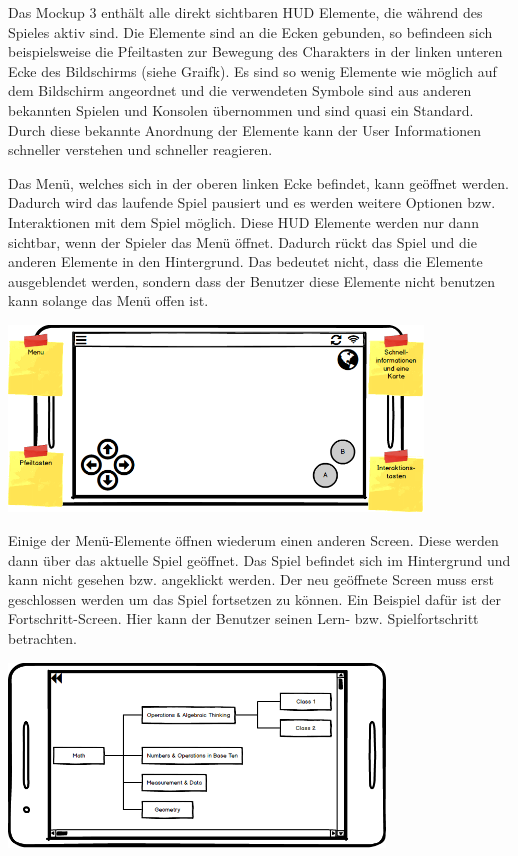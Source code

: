 			Das Mockup 3 enthält alle direkt sichtbaren HUD Elemente, die während des Spieles aktiv sind. Die Elemente sind an die Ecken gebunden, so befindeen sich beispielsweise die Pfeiltasten zur Bewegung des Charakters in der linken unteren Ecke des Bildschirms (siehe Graifk). Es sind so wenig Elemente wie möglich auf dem Bildschirm angeordnet und die verwendeten Symbole sind aus anderen bekannten Spielen und Konsolen übernommen und sind quasi ein Standard. Durch diese bekannte Anordnung der Elemente kann der User Informationen schneller verstehen und schneller reagieren. %
			
			Das Menü, welches sich in der oberen linken Ecke befindet, kann geöffnet werden. Dadurch wird das laufende Spiel pausiert und es werden weitere Optionen bzw. Interaktionen mit dem Spiel möglich. Diese HUD Elemente werden nur dann sichtbar, wenn der Spieler das Menü öffnet. Dadurch rückt das Spiel und die anderen Elemente in den Hintergrund. Das bedeutet nicht, dass die Elemente ausgeblendet werden, sondern dass der Benutzer diese Elemente nicht benutzen kann solange das Menü offen ist.
			
			\begin{center}
				\includegraphics[width=11cm]{pics/HUD_Mockup.png}
			\end{center}
			
			Einige der Menü-Elemente öffnen wiederum einen anderen Screen. Diese werden dann über das aktuelle Spiel geöffnet. Das Spiel befindet sich im Hintergrund und kann nicht gesehen bzw. angeklickt werden. Der neu geöffnete Screen muss erst geschlossen werden um das Spiel fortsetzen zu können. Ein Beispiel dafür ist der Fortschritt-Screen. Hier kann der Benutzer seinen Lern- bzw. Spielfortschritt betrachten.
			
			\begin{center}
				\includegraphics[width=10cm]{pics/Fortschritt_Mockup.png}
			\end{center}
			
